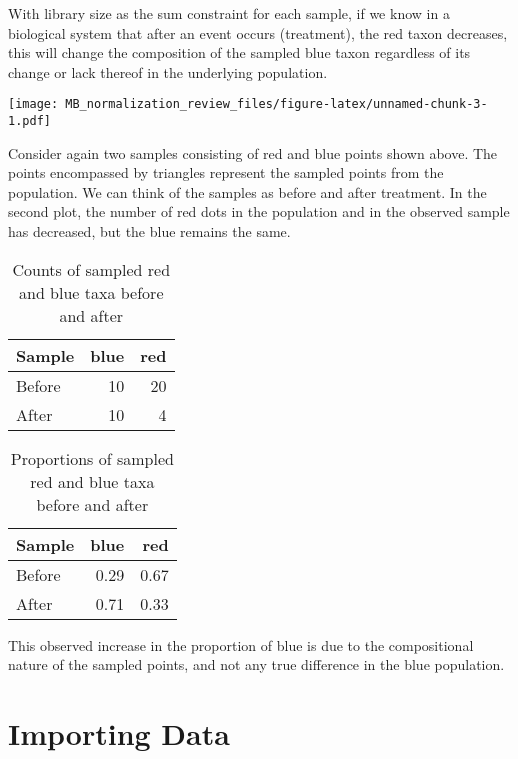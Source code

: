 \documentclass[
]{book}
\begin{document}
With library size as the sum constraint for each sample, if we know in a biological system that after an event occurs (treatment), the red taxon decreases, this will change the composition of the sampled blue taxon regardless of its change or lack thereof in the underlying population.

\texttt{[image: MB\_normalization\_review\_files/figure-latex/unnamed-chunk-3-1.pdf]}

Consider again two samples consisting of red and blue points shown above. The points encompassed by triangles represent the sampled points from the population. We can think of the samples as before and after treatment. In the second plot, the number of red dots in the population and in the observed sample has decreased, but the blue remains the same.

\begin{table}

\caption{\label{tab:unnamed-chunk-4}Counts of sampled red and blue taxa before and after}
\centering
\begin{tabular}[t]{l|r|r}
\hline
Sample & blue & red\\
\hline
Before & 10 & 20\\
\hline
After & 10 & 4\\
\hline
\end{tabular}
\end{table}

\begin{table}

\caption{\label{tab:unnamed-chunk-4}Proportions of sampled red and blue taxa before and after}
\centering
\begin{tabular}[t]{l|r|r}
\hline
Sample & blue & red\\
\hline
Before & 0.29 & 0.67\\
\hline
After & 0.71 & 0.33\\
\hline
\end{tabular}
\end{table}

This observed increase in the proportion of blue is due to the compositional nature of the sampled points, and not any true difference in the blue population.

\hypertarget{importing-data}{%
\chapter{Importing Data}\label{importing-data}}
\end{document}
